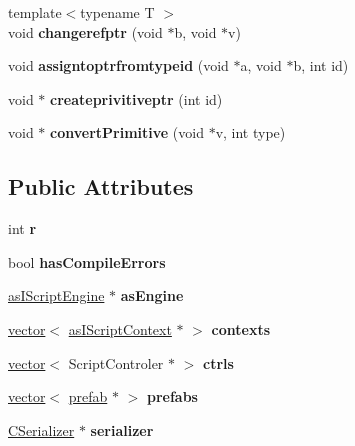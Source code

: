 \begin{DoxyCompactItemize}
\item 
\mbox{\label{struct_script_manager_a5d1b276985d7c88341ad4bd902c029c8}} 
{\footnotesize template$<$typename T $>$ }\\void {\bfseries changerefptr} (void $\ast$b, void $\ast$v)
\item 
\mbox{\label{struct_script_manager_ad427d35e8b7f9074ab94c53816515210}} 
void {\bfseries assigntoptrfromtypeid} (void $\ast$a, void $\ast$b, int id)
\item 
\mbox{\label{struct_script_manager_a3487324b95fafd057c00f105a952f6b3}} 
void $\ast$ {\bfseries createprivitiveptr} (int id)
\item 
\mbox{\label{struct_script_manager_a04e4e986c42fb0437be0292ceb828594}} 
void $\ast$ {\bfseries convert\+Primitive} (void $\ast$v, int type)
\end{DoxyCompactItemize}
\subsection*{Public Attributes}
\begin{DoxyCompactItemize}
\item 
\mbox{\label{struct_script_manager_a9db2109a48d3193e6d146e17f7668262}} 
int {\bfseries r}
\item 
\mbox{\label{struct_script_manager_ac85da700bbfe9ec6c4724d14ad2e24a1}} 
bool {\bfseries has\+Compile\+Errors}
\item 
\mbox{\label{struct_script_manager_accbab66aac938a203b184f5c13e62d26}} 
\hyperlink{classas_i_script_engine}{as\+I\+Script\+Engine} $\ast$ {\bfseries as\+Engine}
\item 
\mbox{\label{struct_script_manager_adc99cebfc9eb9b4cc5eb55a8ae67e571}} 
\hyperlink{structvector}{vector}$<$ \hyperlink{classas_i_script_context}{as\+I\+Script\+Context} $\ast$ $>$ {\bfseries contexts}
\item 
\mbox{\label{struct_script_manager_a90613d9b3eca234d2ec29fdb6139ab37}} 
\hyperlink{structvector}{vector}$<$ Script\+Controler $\ast$ $>$ {\bfseries ctrls}
\item 
\mbox{\label{struct_script_manager_a5e220624877153564a1fadf07f25ec0c}} 
\hyperlink{structvector}{vector}$<$ \hyperlink{structprefab}{prefab} $\ast$ $>$ {\bfseries prefabs}
\item 
\mbox{\label{struct_script_manager_a4484c1812976e868756d8a5fe3be8e11}} 
\hyperlink{class_c_serializer}{C\+Serializer} $\ast$ {\bfseries serializer}
\end{DoxyCompactItemize}


